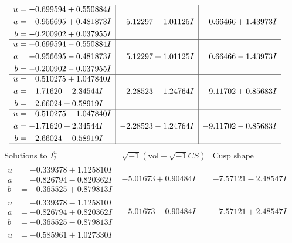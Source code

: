 \documentclass[1p]{elsarticle_modified}
\theoremstyle{definition}
\newcommand{\I}{\sqrt{-1}}
\begin{document}
$$\begin{array}{c|c|c}
\begin{aligned}
u &= -0.699594 + 0.550884 I \\
a &= -0.956695 + 0.481873 I \\
b &= -0.200902 + 0.037955 I\end{aligned}
 & \phantom{-}5.12297 - 1.01125 I & \phantom{-}0.66466 + 1.43973 I \\ \hline\begin{aligned}
u &= -0.699594 - 0.550884 I \\
a &= -0.956695 - 0.481873 I \\
b &= -0.200902 - 0.037955 I\end{aligned}
 & \phantom{-}5.12297 + 1.01125 I & \phantom{-}0.66466 - 1.43973 I \\ \hline\begin{aligned}
u &= \phantom{-}0.510275 + 1.047840 I \\
a &= -1.71620 - 2.34544 I \\
b &= \phantom{-}2.66024 + 0.58919 I\end{aligned}
 & -2.28523 + 1.24764 I & -9.11702 + 0.85683 I \\ \hline\begin{aligned}
u &= \phantom{-}0.510275 - 1.047840 I \\
a &= -1.71620 + 2.34544 I \\
b &= \phantom{-}2.66024 - 0.58919 I\end{aligned}
 & -2.28523 - 1.24764 I & -9.11702 - 0.85683 I\\
 \hline 
 \end{array}$$\newpage$$\begin{array}{c|c|c}  
\text{Solutions to }I^u_{2}& \I (\text{vol} + \sqrt{-1}CS) & \text{Cusp shape}\\
 \hline 
\begin{aligned}
u &= -0.339378 + 1.125810 I \\
a &= -0.826794 - 0.820362 I \\
b &= -0.365525 + 0.879813 I\end{aligned}
 & -5.01673 + 0.90484 I & -7.57121 - 2.48547 I \\ \hline\begin{aligned}
u &= -0.339378 - 1.125810 I \\
a &= -0.826794 + 0.820362 I \\
b &= -0.365525 - 0.879813 I\end{aligned}
 & -5.01673 - 0.90484 I & -7.57121 + 2.48547 I \\ \hline\begin{aligned}
u &= -0.585961 + 1.027330 I \\

\end{aligned}
\end{array}$$
\end{document}
